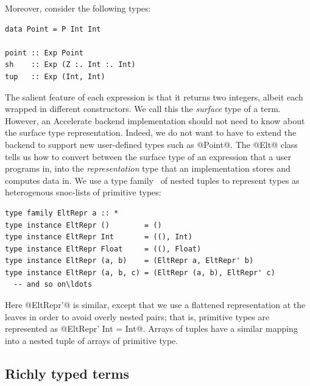 Moreover, consider the following types:
%
\begin{lstlisting}[style=haskell]
data Point = P Int Int

point :: Exp Point
sh    :: Exp (Z :. Int :. Int)
tup   :: Exp (Int, Int)
\end{lstlisting}
%
The salient feature of each expression is that it returns two integers, albeit
each wrapped in different constructors. We call this the \emph{surface} type
of a term. However, an Accelerate backend implementation should not need to know
about the surface type representation. Indeed, we do not want to have to extend
the backend to support new user-defined types such as @Point@. The @Elt@ class
tells us how to convert between the surface type of an expression that a user
programs in, into the \emph{representation} type that an implementation stores
and computes data in. We use a type
family~\cite{Chakravarty:2005dx,Schrijvers:2008ir} of nested tuples to represent
types as heterogenous snoc-lists of primitive types:
%
\begin{lstlisting}[style=haskell]
type family EltRepr a :: *
type instance EltRepr ()        = ()
type instance EltRepr Int       = ((), Int)
type instance EltRepr Float     = ((), Float)
type instance EltRepr (a, b)    = (EltRepr a, EltRepr' b)
type instance EltRepr (a, b, c) = (EltRepr (a, b), EltRepr' c)
  -- and so on\ldots
\end{lstlisting}
%
Here @EltRepr'@ is similar, except that we use a flattened representation at the
leaves in order to avoid overly nested pairs; that is, primitive types are
represented as @EltRepr' Int = Int@. Arrays of tuples have a similar mapping
into a nested tuple of arrays of primitive type.


\subsection{Richly typed terms}
\label{sec:richly_typed_terms}

